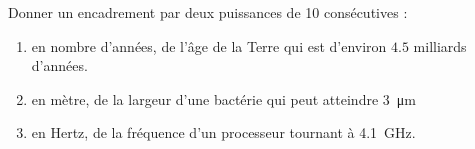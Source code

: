 
\begin{exercice}\label{exo2smath-0208}

Donner un encadrement par deux puissances de 10 consécutives :
\begin{enumerate}
    \item
 en nombre d'années, de l'âge de la Terre qui est d'environ \( 4.5\) milliards d'années.
\item
    en mètre, de la largeur d'une bactérie qui peut atteindre \SI{3}{\micro\meter}
\item
    en Hertz, de la fréquence d'un processeur tournant à \SI{4.1}{\giga\hertz}.
\end{enumerate}

\end{exercice}
